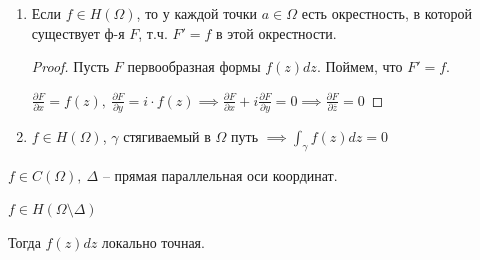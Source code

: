 \begin{consequence}
    \begin{enumerate}
        \item {
            Если $f \in H(\Omega)$, то у каждой точки $a \in \Omega$ есть окрестность, в которой существует ф-я $F$, т.ч. $F' = f$ в этой окрестности.

            \begin{proof}
                Пусть $F$ первообразная формы $f(z) dz$. Поймем, что $F' = f$.

                $\frac{\partial F}{\partial x} = f(z), \ \frac{\partial F}{\partial y} = i \cdot f(z) \implies \frac{\partial F}{\partial x} + i \frac{\partial F}{\partial y} = 0 \implies \frac{\partial F}{\partial \overline{z}} = 0$
            \end{proof}
        }
        \item {
            $f \in H(\Omega)$, $\gamma$ стягиваемый в $\Omega$ путь $\implies \int_{\gamma} { f(z) dz } = 0$
        }
    \end{enumerate}
\end{consequence}
\begin{theorem}
    $f \in C(\Omega), \ \Delta$ -- прямая параллельная оси координат.

    $f \in H(\Omega \setminus \Delta)$

    Тогда $f(z) dz$ локально точная.
\end{theorem}

